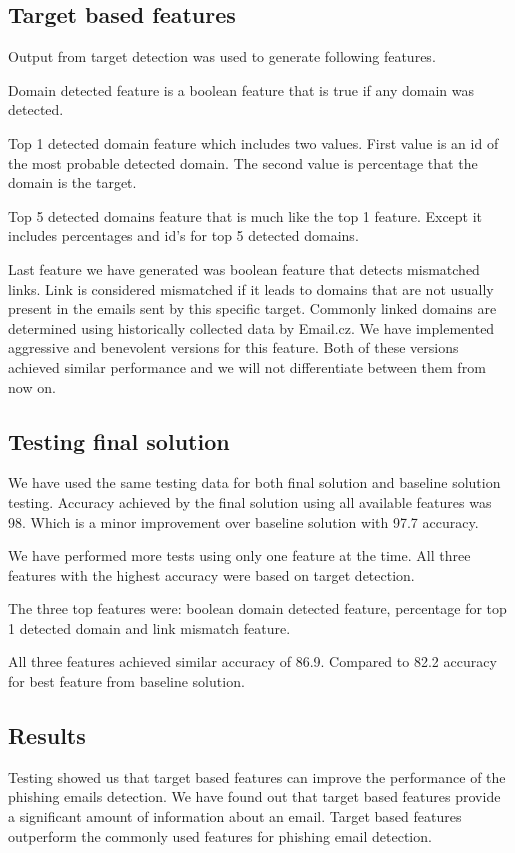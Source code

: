 \documentclass[thesis=B,english]{FITthesis}[2012/10/20]
\begin{document}
\subsection{Target based features}
Output from target detection was used to generate following features.
\par Domain detected feature is a boolean feature that is true if any domain was detected.
\par Top 1 detected domain feature which includes two values. First value is an id of the most probable detected domain. The second value is percentage that the domain is the target. 
\par Top 5 detected domains feature that is much like the top 1 feature. Except it includes percentages and id's for top 5 detected domains.
\par Last feature we have generated was boolean feature that detects mismatched links. Link is considered mismatched if it leads to domains that are not usually present in the emails sent by this specific target. Commonly linked domains are determined using historically collected data by Email.cz. We have implemented aggressive and benevolent versions for this feature. Both of these versions achieved similar performance and we will not differentiate between them from now on.


\subsection{Testing final solution} 
We have used the same testing data for both final solution and baseline solution testing.
Accuracy achieved by the final solution using all available features was 98. Which is a minor improvement over baseline solution with 97.7 accuracy. 

\par We have performed more tests using only one feature at the time. All three features with the highest accuracy were based on target detection. 
\par The three top features were: boolean domain detected feature, percentage for top 1 detected domain and link mismatch feature.
\par All three features achieved similar accuracy of 86.9. Compared to 82.2 accuracy for best feature from baseline solution.


\subsection{Results}
Testing showed us that target based features can improve the performance of the phishing emails detection.
We have found out that target based features provide a significant amount of information about an email.
Target based features outperform the commonly used features for phishing email detection.
\end{document}
